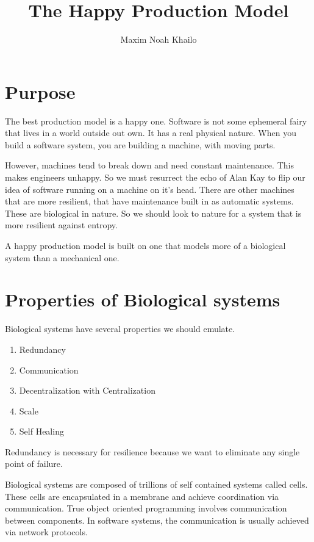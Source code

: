 \documentclass[11pt]{article}
\title{The Happy Production Model}
\author{Maxim Noah Khailo}
\begin{document}
\maketitle
\section{Purpose}

The best production model is a happy one. Software is not some ephemeral fairy that
lives in a world outside out own. It has a real physical nature. When you build
a software system, you are building a machine, with moving parts. 

However, machines tend to break down and need constant maintenance. This makes
engineers unhappy. So we must resurrect the echo of Alan Kay to flip our idea
of software running on a machine on it's head. There are other machines that are
more resilient, that have maintenance built in as automatic systems. These are
biological in nature. So we should look to nature for a system that is more resilient
against entropy. 

A happy production model is built on one that models more of a biological system
than a mechanical one.

\section{Properties of Biological systems}

Biological systems have several properties we should emulate.

\begin{enumerate}
    \item Redundancy
    \item Communication
    \item Decentralization with Centralization
    \item Scale
    \item Self Healing
\end{enumerate}

Redundancy is necessary for resilience because we want to eliminate any single
point of failure.  

Biological systems are composed of trillions of self contained systems called cells. 
These cells are encapsulated in a membrane and achieve coordination via communication. 
True object oriented programming involves communication between components. In 
software systems, the communication is usually achieved via network protocols. 
\end{document}
